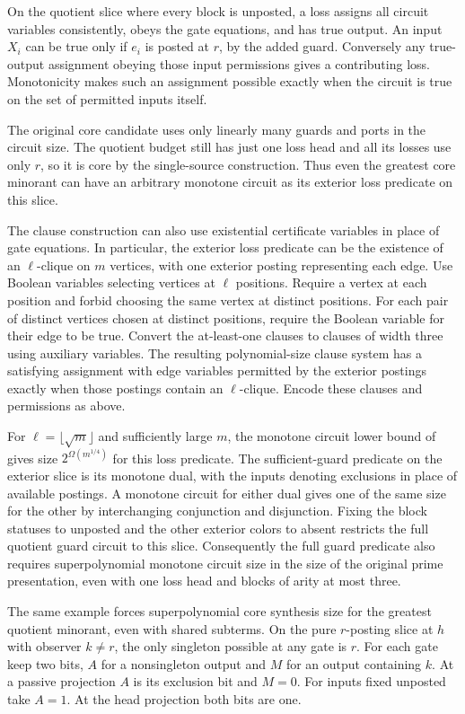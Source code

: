On the quotient slice where every block is
unposted, a loss assigns all circuit variables
consistently, obeys the gate equations, and has
true output. An input $X_i$ can be true only
if $e_i$ is posted at $r$, by the added guard.
Conversely any true-output assignment obeying
those input permissions gives a contributing
loss. Monotonicity makes such an assignment
possible exactly when the circuit is true on
the set of permitted inputs itself.

The original core candidate uses only linearly
many guards and ports in the circuit size.
The quotient budget still has just one loss
head and all its losses use only $r$, so it is
core by the single-source construction. Thus
even the greatest core minorant can have an
arbitrary monotone circuit as its exterior loss
predicate on this slice.

The clause construction can also use existential
certificate variables in place of gate equations.
In particular, the exterior loss predicate can be
the existence of an $\ell$-clique on $m$ vertices,
with one exterior posting representing each edge.
Use Boolean variables selecting vertices at
$\ell$ positions. Require a vertex at each
position and forbid choosing the same vertex
at distinct positions. For each pair of distinct
vertices chosen at distinct positions, require
the Boolean variable for their edge to be true.
Convert the at-least-one clauses to clauses of
width three using auxiliary variables. The
resulting polynomial-size clause system has a
satisfying assignment with edge variables permitted
by the exterior postings exactly when those
postings contain an $\ell$-clique. Encode these
clauses and permissions as above.

For $\ell=\lfloor\sqrt m\rfloor$ and sufficiently
large $m$, the monotone circuit lower bound of
\citet[Theorem 3.9]{AlonBoppana1987} gives size
$2^{\Omega(m^{1/4})}$ for this loss predicate.
The sufficient-guard predicate on the exterior
slice is its monotone dual, with the inputs
denoting exclusions in place of available
postings. A monotone circuit for either dual
gives one of the same size for the other by
interchanging conjunction and disjunction.
Fixing the block statuses to unposted and
the other exterior colors to absent restricts
the full quotient guard circuit to this slice.
Consequently the full guard predicate also
requires superpolynomial monotone circuit size
in the size of the original prime presentation,
even with one loss head and blocks of arity at
most three.

The same example forces superpolynomial core
synthesis size for the greatest quotient minorant,
even with shared subterms. On the pure $r$-posting
slice at $h$ with observer $k\ne r$, the only
singleton possible at any gate is $r$. For each
gate keep two bits, $A$ for a nonsingleton output
and $M$ for an output containing $k$. At a passive
projection $A$ is its exclusion bit and $M=0$.
For inputs fixed unposted take $A=1$. At the
head projection both bits are one.

